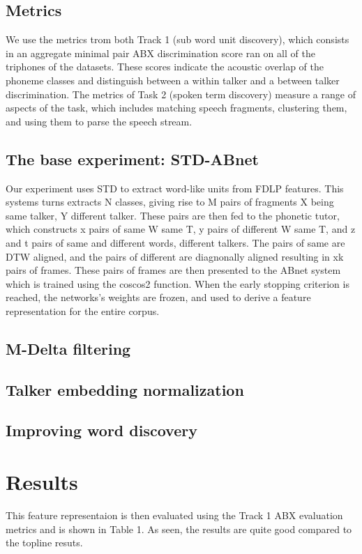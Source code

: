 \documentclass[a4paper]{article}
\begin{document}
\subsection{Metrics}
We use the metrics trom both Track 1 (sub word unit discovery), which consists in an aggregate minimal pair ABX discrimination score ran on all of the triphones of the datasets. These scores indicate the acoustic overlap of the phoneme classes and distinguish between a within talker and a between talker discrimination. The metrics of Task 2 (spoken term discovery) measure a range of aspects of the task, which includes matching speech fragments, clustering them, and using them to parse the speech stream. 
\subsection{The base experiment: STD-ABnet}
Our experiment uses STD to extract word-like units from FDLP features. This systems turns extracts N classes, giving rise to M pairs of fragments X being same talker, Y different talker. These pairs are then fed to the phonetic tutor, which constructs x pairs of same W same T, y pairs of different W same T, and z and t pairs of same and different words, different talkers. The pairs of same are DTW aligned, and the pairs of different are diagnonally aligned resulting in xk pairs of frames. 
These pairs of frames are then presented to the ABnet system which is trained using the coscos2 function. When the early stopping criterion is reached, the networks's weights are frozen, and used to derive a feature representation for the entire corpus. 
\subsection{M-Delta filtering}
\subsection{Talker embedding normalization}
\subsection{Improving word discovery}

\section{Results}
This feature representaion is then evaluated using the Track 1 ABX evaluation metrics and is shown in Table 1.
As seen, the results are quite good compared to the topline resuts. 
\end{document}
